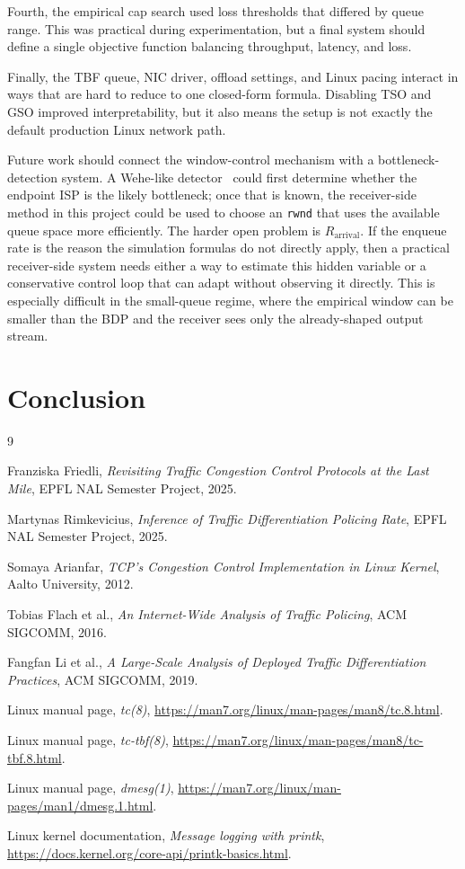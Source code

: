 \documentclass{article}
\newcommand{\code}[1]{\texttt{#1}}
\begin{document}
Fourth, the empirical cap search used loss thresholds that differed by queue range. This was practical 
during experimentation, but a final system should define a single objective function balancing throughput, latency, and loss.

Finally, the TBF queue, NIC driver, offload settings, and Linux pacing interact in ways that are hard 
to reduce to one closed-form formula. Disabling TSO and GSO improved interpretability, but it also means 
the setup is not exactly the default production Linux network path.

Future work should connect the window-control mechanism with a bottleneck-detection system. A Wehe-like detector~\cite{wehe} could 
first determine whether the endpoint ISP is the likely bottleneck; once that is known, the receiver-side method in this 
project could be used to choose an \code{rwnd} that uses the available queue space more efficiently. The harder open 
problem is \(R_{\mathrm{arrival}}\). If the enqueue rate is the reason the simulation formulas do not directly apply, 
then a practical receiver-side system needs either a way to estimate this hidden variable or a conservative control loop 
that can adapt without observing it directly. This is especially difficult in the small-queue regime, where the empirical 
window can be smaller than the BDP and the receiver sees only the already-shaped output stream.

\section{Conclusion}

\begin{thebibliography}{9}

Franziska Friedli, \emph{Revisiting Traffic Congestion Control Protocols at the Last Mile}, EPFL NAL Semester Project, 2025.

Martynas Rimkevicius, \emph{Inference of Traffic Differentiation Policing Rate}, EPFL NAL Semester Project, 2025.

Somaya Arianfar, \emph{TCP's Congestion Control Implementation in Linux Kernel}, Aalto University, 2012.

Tobias Flach et al., \emph{An Internet-Wide Analysis of Traffic Policing}, ACM SIGCOMM, 2016.

Fangfan Li et al., \emph{A Large-Scale Analysis of Deployed Traffic Differentiation Practices}, ACM SIGCOMM, 2019.

Linux manual page, \emph{tc(8)}, \url{https://man7.org/linux/man-pages/man8/tc.8.html}.

Linux manual page, \emph{tc-tbf(8)}, \url{https://man7.org/linux/man-pages/man8/tc-tbf.8.html}.

Linux manual page, \emph{dmesg(1)}, \url{https://man7.org/linux/man-pages/man1/dmesg.1.html}.

Linux kernel documentation, \emph{Message logging with printk}, \url{https://docs.kernel.org/core-api/printk-basics.html}.

\end{thebibliography}
\end{document}
